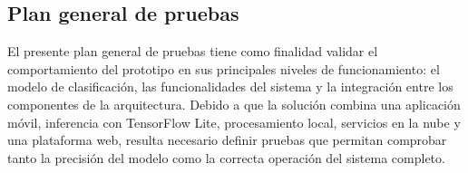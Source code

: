 \newpage
\subsection{Plan general de pruebas}
El presente plan general de pruebas tiene como finalidad validar el comportamiento del prototipo en sus principales niveles de funcionamiento: el modelo de clasificación, las funcionalidades del sistema y la integración entre los componentes de la arquitectura. Debido a que la solución combina una aplicación móvil, inferencia con TensorFlow Lite, procesamiento local, servicios en la nube y una plataforma web, resulta necesario definir pruebas que permitan comprobar tanto la precisión del modelo como la correcta operación del sistema completo.

